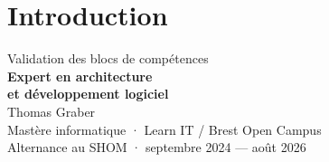 \section{Introduction}

\begin{frame}[plain]
  \vfill
  \begin{center}
    {\color{white!75}\large Validation des blocs de compétences}\\[0.45em]
    {\color{white}\Huge\bfseries Expert en architecture}\\[-0.05em]
    {\color{white}\Huge\bfseries et développement logiciel}\\[1.3em]
    {\color{white}\large Thomas Graber}\\[0.25em]
    {\color{white!72}Mastère informatique · Learn IT / Brest Open Campus}\\[0.15em]
    {\color{white!72}Alternance au SHOM · septembre 2024 — août 2026}
  \end{center}
  \vfill
\end{frame}


